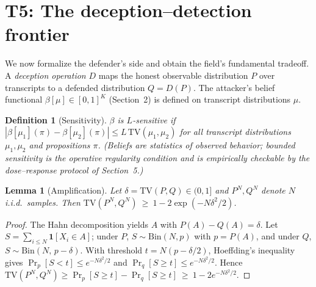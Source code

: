\documentclass[11pt]{article}
\newtheorem{lemma}{Lemma}
\newtheorem{definition}{Definition}
\begin{document}
\section{T5: The deception--detection frontier}\label{sec:t5}

We now formalize the defender's side and obtain the field's fundamental tradeoff. A \emph{deception operation} $D$ maps the honest observable distribution $P$ over transcripts to a defended distribution $Q = D(P)$. The attacker's belief functional $\beta[\mu]\in[0,1]^{K}$ (Section~2) is defined on transcript distributions $\mu$.

\begin{definition}[Sensitivity]\label{def:sens}
$\beta$ is \emph{$L$-sensitive} if $|\beta[\mu_1](\pi)-\beta[\mu_2](\pi)|\le L\,\mathrm{TV}(\mu_1,\mu_2)$ for all transcript distributions $\mu_1,\mu_2$ and propositions $\pi$. (Beliefs are statistics of observed behavior; bounded sensitivity is the operative regularity condition and is empirically checkable by the dose--response protocol of Section~5.)
\end{definition}

\begin{lemma}[Amplification]\label{lem:amp}
Let $\delta=\mathrm{TV}(P,Q)\in(0,1]$ and $P^N,Q^N$ denote $N$ i.i.d.\ samples. Then
$\mathrm{TV}(P^N,Q^N)\ \ge\ 1-2\exp(-N\delta^2/2)$.
\end{lemma}
\begin{proof}
The Hahn decomposition yields $A$ with $P(A)-Q(A)=\delta$. Let $S=\sum_{i\le N}\mathbf{1}[X_i\in A]$; under $P$, $S\sim\mathrm{Bin}(N,p)$ with $p=P(A)$, and under $Q$, $S\sim\mathrm{Bin}(N,\,p-\delta)$. With threshold $t=N(p-\delta/2)$, Hoeffding's inequality gives $\Pr_p[S<t]\le e^{-N\delta^2/2}$ and $\Pr_q[S\ge t]\le e^{-N\delta^2/2}$. Hence
$\mathrm{TV}(P^N,Q^N)\ge\Pr_p[S\ge t]-\Pr_q[S\ge t]\ \ge\ 1-2e^{-N\delta^2/2}$.
\end{proof}
\end{document}
